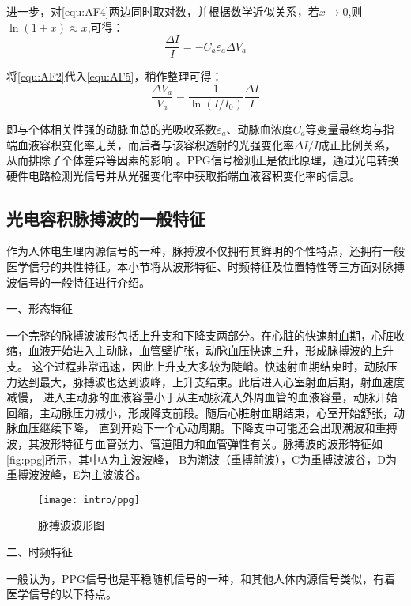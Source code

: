 进一步，对\autoref{equ:AF4}两边同时取对数，并根据数学近似关系，若$x\rightarrow 0$,则$\ln(1+x)\approx x$,可得：
\begin{equation}
    \label{equ:AF5}
    \frac{\Delta I}{I}=-C_{a}\varepsilon _{a}\Delta V_{a}
\end{equation}

将\autoref{equ:AF2}代入\autoref{equ:AF5}，稍作整理可得：
\begin{equation}
    \label{equ:AF6}
    \frac{\Delta V_{a}}{V_{a}}=\frac{1}{\ln(I/I_{0})}\frac{\Delta I}{I}
\end{equation}

即与个体相关性强的动脉血总的光吸收系数$\varepsilon _{a}$、动脉血浓度$C_{a}$等变量最终均与指端血液容积变化率无关，而后者与该容积透射的光强变化率$\Delta I/I$成正比例关系，从而排除了个体差异等因素的影响
\cite{1980Spectrophotometric,4122392,PPGYY}。PPG信号检测正是依此原理，通过光电转换硬件电路检测光信号并从光强变化率中获取指端血液容积变化率的信息。

\subsection{光电容积脉搏波的一般特征}
作为人体电生理内源信号的一种，脉搏波不仅拥有其鲜明的个性特点，还拥有一般医学信号的共性特征。本小节将从波形特征、时频特征及位置特性等三方面对脉搏波信号的一般特征进行介绍。

一、形态特征

一个完整的脉搏波波形包括上升支和下降支两部分。在心脏的快速射血期，心脏收缩，血液开始进入主动脉，血管壁扩张，动脉血压快速上升，形成脉搏波的上升支。
这个过程非常迅速，因此上升支大多较为陡峭。快速射血期结束时，动脉压力达到最大，脉搏波也达到波峰，上升支结束。此后进入心室射血后期，射血速度减慢，
进入主动脉的血液容量小于从主动脉流入外周血管的血液容量，动脉开始回缩，主动脉压力减小，形成降支前段。随后心脏射血期结束，心室开始舒张，动脉血压继续下降，
直到开始下一个心动周期。下降支中可能还会出现潮波和重搏波，其波形特征与血管张力、管道阻力和血管弹性有关。脉搏波的波形特征如\autoref{fig:ppg}所示，其中A为主波波峰，
B为潮波（重搏前波），C为重搏波波谷，D为重搏波波峰，E为主波波谷。
\begin{figure}[htbp]
\centering
\texttt{[image: intro/ppg]} 
\caption{\label{fig:ppg}脉搏波波形图}
\end{figure}

二、时频特征

一般认为，PPG信号也是平稳随机信号的一种，和其他人体内源信号类似，有着医学信号的以下特点\cite{Ma2015,Qiu2012,Naraharisetti2011,Miao2020}。

